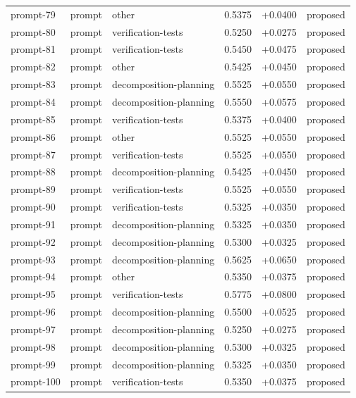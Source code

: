 \begin{center}
\begin{longtable}{llp{5.2cm}rrl}
prompt-79 & prompt & other & 0.5375 & +0.0400 & proposed \\
prompt-80 & prompt & verification-tests & 0.5250 & +0.0275 & proposed \\
prompt-81 & prompt & verification-tests & 0.5450 & +0.0475 & proposed \\
prompt-82 & prompt & other & 0.5425 & +0.0450 & proposed \\
prompt-83 & prompt & decomposition-planning & 0.5525 & +0.0550 & proposed \\
prompt-84 & prompt & decomposition-planning & 0.5550 & +0.0575 & proposed \\
prompt-85 & prompt & verification-tests & 0.5375 & +0.0400 & proposed \\
prompt-86 & prompt & other & 0.5525 & +0.0550 & proposed \\
prompt-87 & prompt & verification-tests & 0.5525 & +0.0550 & proposed \\
prompt-88 & prompt & decomposition-planning & 0.5425 & +0.0450 & proposed \\
prompt-89 & prompt & verification-tests & 0.5525 & +0.0550 & proposed \\
prompt-90 & prompt & verification-tests & 0.5325 & +0.0350 & proposed \\
prompt-91 & prompt & decomposition-planning & 0.5325 & +0.0350 & proposed \\
prompt-92 & prompt & decomposition-planning & 0.5300 & +0.0325 & proposed \\
prompt-93 & prompt & decomposition-planning & 0.5625 & +0.0650 & proposed \\
prompt-94 & prompt & other & 0.5350 & +0.0375 & proposed \\
prompt-95 & prompt & verification-tests & 0.5775 & +0.0800 & proposed \\
prompt-96 & prompt & decomposition-planning & 0.5500 & +0.0525 & proposed \\
prompt-97 & prompt & decomposition-planning & 0.5250 & +0.0275 & proposed \\
prompt-98 & prompt & decomposition-planning & 0.5300 & +0.0325 & proposed \\
prompt-99 & prompt & decomposition-planning & 0.5325 & +0.0350 & proposed \\
prompt-100 & prompt & verification-tests & 0.5350 & +0.0375 & proposed \\
\bottomrule\end{longtable}\end{center}
\clearpage
